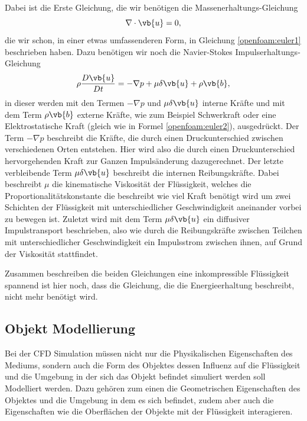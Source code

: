 Dabei ist die Erste Gleichung, die wir benötigen die Massenerhaltungs-Gleichung 
\[\nabla \cdot \vb{u}
=
0
,
\]
die wir schon, in einer etwas umfassenderen Form, in Gleichung \eqref{openfoam:euler1} beschrieben haben.
Dazu benötigen wir noch die Navier-Stokes Impulserhaltungs-Gleichung 
\begin{equation}
\rho \frac{D\vb{u}}{Dt}
=
- \nabla p + \mu \delta \vb{u} +\rho \vb{b} 
,\end{equation}
in dieser werden mit den Termen $- \nabla p$ und $\mu \delta \vb{u}$ interne Kräfte und mit dem Term $\rho \vb{b}$ externe Kräfte, wie zum Beispiel Schwerkraft oder eine Elektrostatische Kraft (gleich wie in Formel \eqref{openfoam:euler2}), ausgedrückt.
Der Term $- \nabla p$ beschreibt die Kräfte, die durch einen Druckunterschied zwischen verschiedenen Orten entstehen.
Hier wird also die durch einen Druckunterschied hervorgehenden Kraft zur Ganzen Impulsänderung dazugerechnet.
Der letzte verbleibende Term $\mu \delta \vb{u}$ beschreibt die internen Reibungskräfte.
Dabei beschreibt $\mu$ die kinematische Viskosität der Flüssigkeit, welches die Proportionalitätskonstante die beschreibt wie viel Kraft benötigt wird um zwei Schichten der Flüssigkeit mit unterschiedlicher Geschwindigkeit aneinander vorbei zu bewegen ist.
Zuletzt wird mit dem Term $\mu \delta \vb{u}$ ein diffusiver Impulstransport beschrieben, also wie durch die Reibungskräfte zwischen Teilchen mit unterschiedlicher Geschwindigkeit ein Impulsstrom zwischen ihnen, auf Grund der Viskosität stattfindet.

Zusammen beschreiben die beiden Gleichungen eine inkompressible Flüssigkeit spannend ist hier noch, dass die Gleichung, die die Energieerhaltung beschreibt, nicht mehr benötigt wird. 

\subsection{Objekt Modellierung}
Bei der CFD Simulation müssen nicht nur die Physikalischen Eigenschaften des Mediums, sondern auch die Form des Objektes dessen Influenz auf die Flüssigkeit und die Umgebung in der sich das Objekt befindet simuliert werden soll Modelliert werden.
Dazu gehören zum einen die Geometrischen Eigenschaften des Objektes und die Umgebung in dem es sich befindet, zudem aber auch die Eigenschaften wie die Oberflächen der Objekte mit der Flüssigkeit interagieren.

